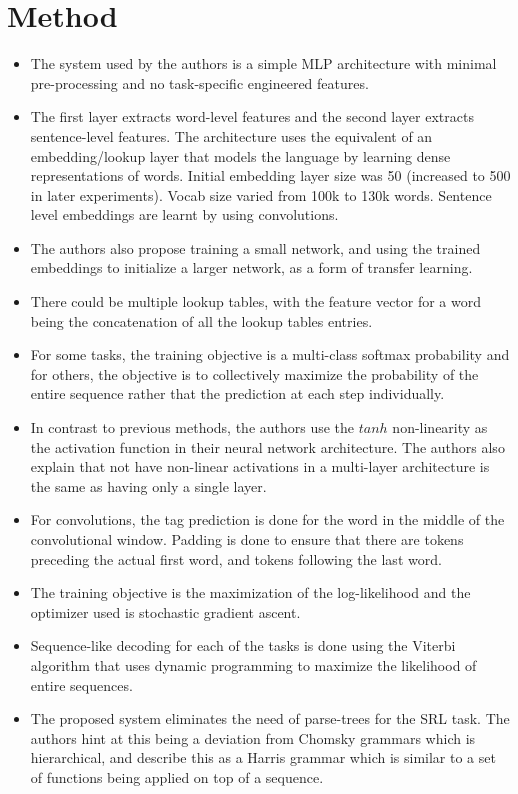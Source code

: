 \documentclass[12pt]{scrartcl}
\begin{document}
\section{Method}
  \begin{itemize}
    \item The system used by the authors is a simple MLP architecture with minimal pre-processing and no task-specific engineered features.
    \item The first layer extracts word-level features and the second layer extracts sentence-level features. The architecture uses the equivalent of an embedding/lookup layer that models the language by learning dense representations of words. Initial embedding layer size was 50 (increased to 500 in later experiments). Vocab size varied from 100k to 130k words. Sentence level embeddings are learnt by using convolutions.
    \item The authors also propose training a small network, and using the trained embeddings to initialize a larger network, as a form of transfer learning.
    \item There could be multiple lookup tables, with the feature vector for a word being the concatenation of all the lookup tables entries.
    \item For some tasks, the training objective is a multi-class softmax probability and for others, the objective is to collectively maximize the probability of the entire sequence rather that the prediction at each step individually.
    \item In contrast to previous methods, the authors use the $tanh$ non-linearity as the activation function in their neural network architecture. The authors also explain that not have non-linear activations in a multi-layer architecture is the same as having only a single layer.
    \item For convolutions, the tag prediction is done for the word in the middle of the convolutional window. Padding is done to ensure that there are tokens preceding the actual first word, and tokens following the last word.
    \item The training objective is the maximization of the log-likelihood and the optimizer used is stochastic gradient ascent.
    \item Sequence-like decoding for each of the tasks is done using the Viterbi algorithm that uses dynamic programming to maximize the likelihood of entire sequences.
    \item The proposed system eliminates the need of parse-trees for the SRL task. The authors hint at this being a deviation from Chomsky grammars which is hierarchical, and describe this as a Harris grammar which is similar to a set of functions being applied on top of a sequence.

\end{itemize}
\end{document}
